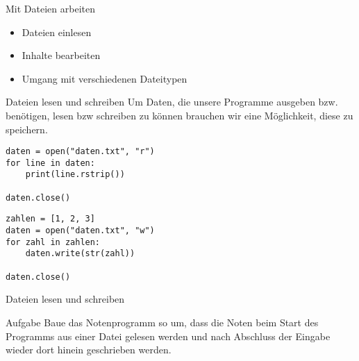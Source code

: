 \begin{frame}[fragile]{Mit Dateien arbeiten}
	\begin{itemize}
		\item Dateien einlesen
		\item Inhalte bearbeiten
		\item Umgang mit verschiedenen Dateitypen
	\end{itemize}
\end{frame}

\begin{frame}[fragile]{Dateien lesen und schreiben}
Um Daten, die unsere Programme ausgeben bzw. benötigen, lesen bzw schreiben zu können brauchen wir eine 
Möglichkeit, diese zu speichern.
\pause{}
\begin{lstlisting}
daten = open("daten.txt", "r")
for line in daten:
    print(line.rstrip())

daten.close()
\end{lstlisting}

\pause{}

\begin{lstlisting}
zahlen = [1, 2, 3]
daten = open("daten.txt", "w")
for zahl in zahlen:
    daten.write(str(zahl))

daten.close()
\end{lstlisting}
\end{frame}

\begin{frame}[fragile]{Dateien lesen und schreiben}
\begin{block}{Aufgabe}
Baue das Notenprogramm so um, dass die Noten beim Start des Programms aus einer Datei gelesen 
werden und nach Abschluss der Eingabe wieder dort hinein geschrieben werden.
\end{block}
\end{frame}


